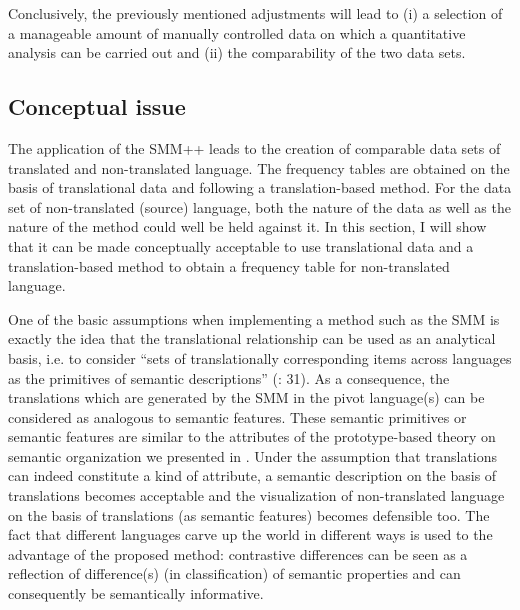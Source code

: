Conclusively, the previously mentioned adjustments will lead to (i) a selection of a manageable amount of manually controlled data on which a quantitative analysis can be carried out and (ii) the comparability of the two data sets.


\subsection{\label{sec:3.5.4}  Conceptual issue}

The application of the SMM++ leads to the creation of comparable data sets of translated and non-translated language. The frequency tables are obtained on the basis of translational data and following a translation-based method. For the data set of non-translated (source) language, both the nature of the data as well as the nature of the method could well be held against it. In this section, I will show that it can be made conceptually acceptable to use translational data and a translation-based method to obtain a frequency table for non-translated language.



One of the basic assumptions when implementing a method such as the SMM is exactly the idea that the translational relationship can be used as an analytical basis, i.e. to consider “sets of translationally corresponding items across languages as the primitives of semantic descriptions” (\citealt{langemets_translations_2005}: 31). As a consequence, the translations which are generated by the SMM in the pivot language(s) can be considered as analogous to semantic features. These semantic primitives or semantic features are similar to the attributes of the prototype-based theory on semantic organization we presented in . Under the assumption that translations can indeed constitute a kind of attribute, a semantic description on the basis of translations becomes acceptable and the visualization of non-translated language on the basis of translations (as semantic features) becomes defensible too. The fact that different languages carve up the world in different ways is used to the advantage of the proposed method: contrastive differences can be seen as a reflection of difference(s) (in classification) of semantic properties and can consequently be semantically informative.



